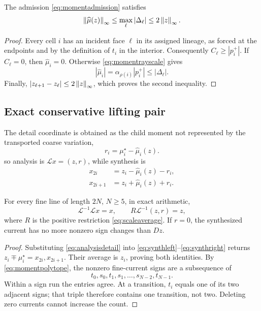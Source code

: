 \begin{lemma}
The admission \eqref{eq:momentadmission} satisfies
\begin{equation}
 \left\lVert\widehat\mu(z)\right\rVert_\infty\leq
 \max_\ell|\Delta_\ell|\leq2\left\lVert z\right\rVert_\infty.
 \label{eq:admittedmomentbound}
\end{equation}
\end{lemma}

\begin{proof}
Every cell \(i\) has an incident face \(\ell\) in its assigned lineage, as
forced at the endpoints and by the definition of \(t_i\) in the interior.
Consequently \(C_\ell\geq|p_i^+|\). If \(C_\ell=0\), then
\(\widehat\mu_i=0\). Otherwise
\eqref{eq:momentrayscale} gives
\[
 |\widehat\mu_i|
 =\alpha_{\rho(i)}|p_i^+|
 \leq|\Delta_\ell|.
\]
Finally, \(|z_{\ell+1}-z_\ell|\leq2\left\lVert z\right\rVert_\infty\), which proves the second
inequality.
\end{proof}

\subsection{Exact conservative lifting pair}

The detail coordinate is obtained as the child moment not represented by the
transported coarse variation,
\begin{equation}
 r_i=\mu_i^\star-\widehat\mu_i(z).
 \label{eq:analysisdetail}
\end{equation}
so analysis is \(\mathcal Lx=(z,r)\), while synthesis is
\begin{align}
 x_{2i}&=z_i-\widehat\mu_i(z)-r_i,
 \label{eq:synthleft}\\
 x_{2i+1}&=z_i+\widehat\mu_i(z)+r_i.
 \label{eq:synthright}
\end{align}

\begin{theorem}
For every fine line of length \(2N\), \(N\geq5\), in exact arithmetic,
\begin{equation}
 \mathcal L^{-1}\mathcal Lx=x,
 \qquad R\mathcal L^{-1}(z,r)=z,
 \label{eq:fullcycle}
\end{equation}
where \(R\) is the positive restriction \eqref{eq:scaleaverage}. If \(r=0\),
the synthesized current has no more nonzero sign changes than \(Dz\).
\end{theorem}

\begin{proof}
Substituting \eqref{eq:analysisdetail} into
\eqref{eq:synthleft}--\eqref{eq:synthright} returns
\(z_i\mp\mu_i^\star=x_{2i},x_{2i+1}\). Their average is \(z_i\), proving
both identities. By \eqref{eq:momentpolytope}, the nonzero fine-current signs
are a subsequence of
\[
 t_0,s_0,t_1,s_1,\ldots,s_{N-2},t_{N-1}.
\]
Within a sign run the entries agree. At a transition, \(t_i\) equals one of
its two adjacent signs; that triple therefore contains one transition, not
two. Deleting zero currents cannot increase the count.
\end{proof}


